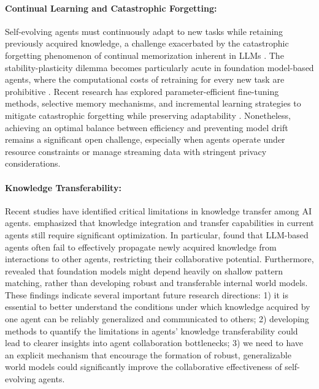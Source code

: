 \paragraph{Continual Learning and Catastrophic Forgetting:} Self-evolving agents must continuously adapt to new tasks while retaining previously acquired knowledge, a challenge exacerbated by the catastrophic forgetting phenomenon \citep{ghosal2024understanding} of continual memorization \citep{chen2024continual} inherent in LLMs \citep{bell2025future}. The stability-plasticity dilemma becomes particularly acute in foundation model-based agents, where the computational costs of retraining for every new task are prohibitive \citep{zheng2025lifelong}. Recent research has explored parameter-efficient fine-tuning methods, selective memory mechanisms, and incremental learning strategies to mitigate catastrophic forgetting while preserving adaptability \citep{wang2024comprehensive}. Nonetheless, achieving an optimal balance between efficiency and preventing model drift remains a significant open challenge, especially when agents operate under resource constraints or manage streaming data with stringent privacy considerations.

\paragraph{Knowledge Transferability:}
Recent studies have identified critical limitations in knowledge transfer among AI agents. \cite{shi2025models} emphasized that knowledge integration and transfer capabilities in current agents still require significant optimization. In particular, \cite{geng2025large} found that LLM-based agents often fail to effectively propagate newly acquired knowledge from interactions to other agents, restricting their collaborative potential. Furthermore, \cite{vafa2025has} revealed that foundation models might depend heavily on shallow pattern matching, rather than developing robust and transferable internal world models. These findings indicate several important future research directions: 1) it is essential to better understand the conditions under which knowledge acquired by one agent can be reliably generalized and communicated to others; 2) developing methods to quantify the limitations in agents' knowledge transferability could lead to clearer insights into agent collaboration bottlenecks; 3) we need to have an explicit mechanism that encourage the formation of robust, generalizable world models could significantly improve the collaborative effectiveness of self-evolving agents. 



